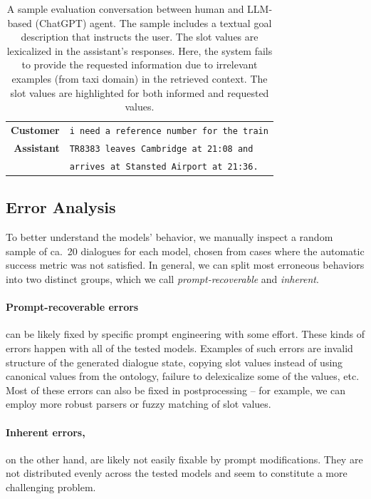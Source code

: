 \begin{table}[tp]
\begin{tabular}{r|l}
         \textbf{Customer} & \texttt{i need a {\color{orange!50!yellow!90!black!100!}reference number} for the train} \\
         \textbf{Assistant} & \texttt{{\color{red!100!yellow!90!black!100!}TR8383 leaves Cambridge at 21:08 and}} \\
         & \texttt{{\color{red!100!yellow!90!black!100!}arrives at Stansted Airport at 21:36}.}\\
         \bottomrule
    \end{tabular}
    \caption{A sample evaluation conversation between human and LLM-based (ChatGPT) agent. The sample includes a textual goal description that instructs the user. The slot values are lexicalized in the assistant's responses. Here, the system {\color{red!100!yellow!90!black!100!} fails} to provide the requested information due to irrelevant examples (from taxi domain) in the retrieved context. The slot values are highlighted for both {\color{cyan!80!yellow!80!black!100 }informed} and {\color{orange!50!yellow!90!black!100!}requested} values.}
    \label{07:tab:human-2}
\end{table}
\subsection{Error Analysis}

To better understand the models' behavior, we manually inspect a random sample of ca.~20 dialogues for each model, chosen from cases where the automatic success metric was not satisfied. 
In general, we can split most erroneous behaviors into two distinct groups, which we call \emph{prompt-recoverable} and \emph{inherent}.

\paragraph{Prompt-recoverable errors} can be likely fixed by specific prompt engineering with some effort.
These kinds of errors happen with all of the tested models.
Examples of such errors are invalid structure of the generated dialogue state, copying slot values instead of using canonical values from the ontology, failure to delexicalize some of the values, etc.
Most of these errors can also be fixed in postprocessing -- for example, we can employ more robust parsers or fuzzy matching of slot values.

\paragraph{Inherent errors,} on the other hand, are likely not easily fixable by prompt modifications.
They are not distributed evenly across the tested models and seem to constitute a more challenging problem.

